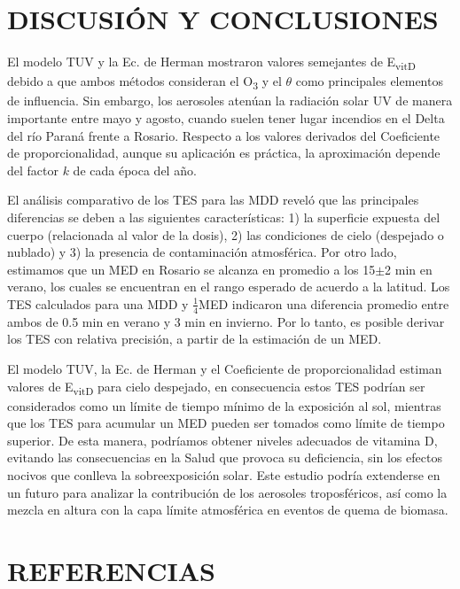 \documentclass[10pt,twocolumn]{article}
\begin{document}
\section{DISCUSIÓN Y CONCLUSIONES}
El modelo TUV y la Ec. de Herman mostraron valores semejantes de E\textsubscript{vitD} debido a que ambos métodos consideran el O\textsubscript{3} y el $\theta$ como principales elementos de influencia. Sin embargo, los aerosoles atenúan la radiación solar UV de manera importante entre mayo y agosto, cuando suelen tener lugar incendios en el Delta del río Paraná frente a Rosario.\cite{IPINA2012966} Respecto a los valores derivados del Coeficiente de proporcionalidad, aunque su aplicación es práctica, la aproximación depende del factor $k$ de cada época del año.

El análisis comparativo de los TES para las MDD reveló que las principales diferencias se deben a las siguientes características: 1) la superficie expuesta del cuerpo (relacionada al valor de la dosis), 2) las condiciones de cielo (despejado o nublado) y 3) la presencia de contaminación atmosférica. Por otro lado, estimamos que un MED en Rosario se alcanza en promedio a los 15$\pm$2 min en verano, los cuales se encuentran en el rango esperado de acuerdo a la latitud. Los TES calculados para una MDD y $\frac{1}{4}$MED indicaron una diferencia promedio entre ambos de 0.5 min en verano y 3 min en invierno. Por lo tanto, es posible derivar los TES con relativa precisión, a partir de la estimación de un MED.

El modelo TUV, la Ec. de Herman y el Coeficiente de proporcionalidad estiman valores de E\textsubscript{vitD} para cielo despejado, en consecuencia estos TES podrían ser considerados como un límite de tiempo mínimo de la exposición al sol, mientras que los TES para acumular un MED pueden ser tomados como límite de tiempo superior. De esta manera, podríamos obtener niveles adecuados de vitamina D, evitando las consecuencias en la Salud que provoca su deficiencia, sin los efectos nocivos que conlleva la sobreexposición solar. Este estudio podría extenderse en un futuro para analizar la contribución de los aerosoles troposféricos, así como la mezcla en altura con la capa límite atmosférica en eventos de quema de biomasa.
\section{REFERENCIAS}
\renewcommand{\refname}{}

\end{document}

